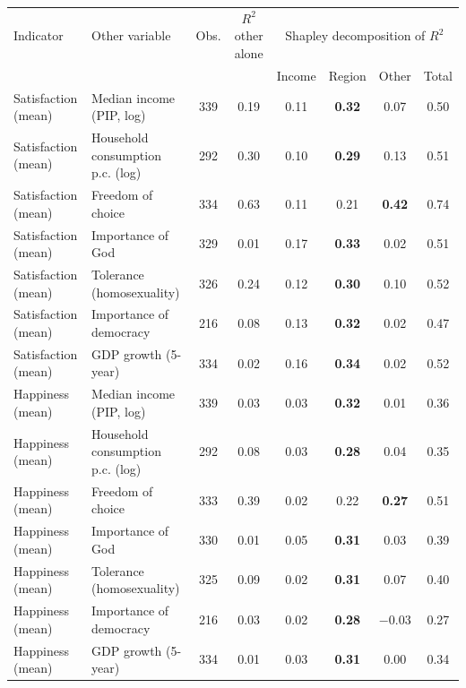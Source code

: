 \begin{tabular}{llcccccc}
\toprule
Indicator & Other variable & Obs. & $R^2$ other alone & \multicolumn{4}{c}{Shapley decomposition of $R^2$} \\ & & & & Income & Region & Other & Total \\
\midrule
Satisfaction (mean) & Median income (PIP, log) & 339 & 0.19 & 0.11 & \textbf{0.32} & 0.07 & 0.50 \\
Satisfaction (mean) & Household consumption p.c. (log) & 292 & 0.30 & 0.10 & \textbf{0.29} & 0.13 & 0.51 \\
Satisfaction (mean) & Freedom of choice & 334 & 0.63 & 0.11 & 0.21 & \textbf{0.42} & 0.74 \\
Satisfaction (mean) & Importance of God & 329 & 0.01 & 0.17 & \textbf{0.33} & 0.02 & 0.51 \\
Satisfaction (mean) & Tolerance (homosexuality) & 326 & 0.24 & 0.12 & \textbf{0.30} & 0.10 & 0.52 \\
Satisfaction (mean) & Importance of democracy & 216 & 0.08 & 0.13 & \textbf{0.32} & 0.02 & 0.47 \\
Satisfaction (mean) & GDP growth (5-year) & 334 & 0.02 & 0.16 & \textbf{0.34} & 0.02 & 0.52 \\
\midrule
Happiness (mean) & Median income (PIP, log) & 339 & 0.03 & 0.03 & \textbf{0.32} & 0.01 & 0.36 \\
Happiness (mean) & Household consumption p.c. (log) & 292 & 0.08 & 0.03 & \textbf{0.28} & 0.04 & 0.35 \\
Happiness (mean) & Freedom of choice & 333 & 0.39 & 0.02 & 0.22 & \textbf{0.27} & 0.51 \\
Happiness (mean) & Importance of God & 330 & 0.01 & 0.05 & \textbf{0.31} & 0.03 & 0.39 \\
Happiness (mean) & Tolerance (homosexuality) & 325 & 0.09 & 0.02 & \textbf{0.31} & 0.07 & 0.40 \\
Happiness (mean) & Importance of democracy & 216 & 0.03 & 0.02 & \textbf{0.28} & \ensuremath{-}0.03 & 0.27 \\
Happiness (mean) & GDP growth (5-year) & 334 & 0.01 & 0.03 & \textbf{0.31} & 0.00 & 0.34 \\
\bottomrule
\end{tabular}
